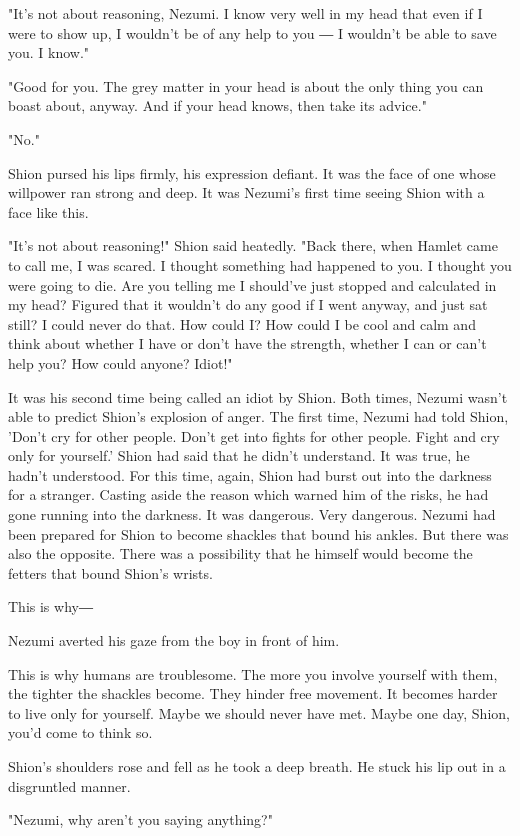 "It's not about reasoning, Nezumi. I know very well in my head that even
if I were to show up, I wouldn't be of any help to you ― I wouldn't be
able to save you. I know."

"Good for you. The grey matter in your head is about the only thing you
can boast about, anyway. And if your head knows, then take its advice."

"No."

Shion pursed his lips firmly, his expression defiant. It was the face of
one whose willpower ran strong and deep. It was Nezumi's first time
seeing Shion with a face like this.

"It's not about reasoning!" Shion said heatedly. "Back there, when
Hamlet came to call me, I was scared. I thought something had happened
to you. I thought you were going to die. Are you telling me I should've
just stopped and calculated in my head? Figured that it wouldn't do any
good if I went anyway, and just sat still? I could never do that. How
could I? How could I be cool and calm and think about whether I have or
don't have the strength, whether I can or can't help you? How could
anyone? Idiot!"

It was his second time being called an idiot by Shion. Both times,
Nezumi wasn't able to predict Shion's explosion of anger. The first
time, Nezumi had told Shion, 'Don't cry for other people. Don't get into
fights for other people. Fight and cry only for yourself.' Shion had
said that he didn't understand. It was true, he hadn't understood. For
this time, again, Shion had burst out into the darkness for a stranger.
Casting aside the reason which warned him of the risks, he had gone
running into the darkness. It was dangerous. Very dangerous. Nezumi had
been prepared for Shion to become shackles that bound his ankles. But
there was also the opposite. There was a possibility that he himself
would become the fetters that bound Shion's wrists.

This is why―

Nezumi averted his gaze from the boy in front of him.

This is why humans are troublesome. The more you involve yourself with
them, the tighter the shackles become. They hinder free movement. It
becomes harder to live only for yourself. Maybe we should never have
met. Maybe one day, Shion, you'd come to think so.

Shion's shoulders rose and fell as he took a deep breath. He stuck his
lip out in a disgruntled manner.

"Nezumi, why aren't you saying anything?"

